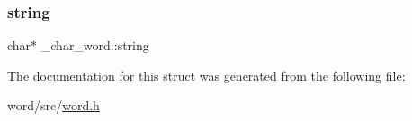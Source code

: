 \mbox{\label{struct__char__word_adaa60c81c7c562ed3e8fee6ec7fa0201}} 
\subsubsection{\texorpdfstring{string}{string}}
{\footnotesize\ttfamily char$\ast$ \+\_\+char\+\_\+word\+::string}



The documentation for this struct was generated from the following file\+:\begin{DoxyCompactItemize}
\item 
word/src/\mbox{\hyperlink{word_8h}{word.\+h}}\end{DoxyCompactItemize}
